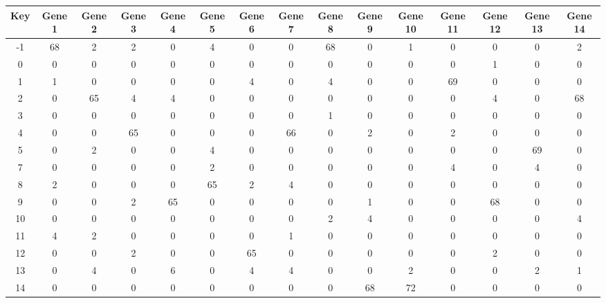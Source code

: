 \begin{tabular}{|c|c|c|c|c|c|c|c|c|c|c|c|c|c|c|}
\hline
Key & Gene 1 & Gene 2 & Gene 3 & Gene 4 & Gene 5 & Gene 6 & Gene 7 & Gene 8 & Gene 9 & Gene 10 & Gene 11 & Gene 12 & Gene 13 & Gene 14 \\
\hline
-1 & 68 & 2 & 2 & 0 & 4 & 0 & 0 & 68 & 0 & 1 & 0 & 0 & 0 & 2 \\
0 & 0 & 0 & 0 & 0 & 0 & 0 & 0 & 0 & 0 & 0 & 0 & 1 & 0 & 0 \\
1 & 1 & 0 & 0 & 0 & 0 & 4 & 0 & 4 & 0 & 0 & 69 & 0 & 0 & 0 \\
2 & 0 & 65 & 4 & 4 & 0 & 0 & 0 & 0 & 0 & 0 & 0 & 4 & 0 & 68 \\
3 & 0 & 0 & 0 & 0 & 0 & 0 & 0 & 1 & 0 & 0 & 0 & 0 & 0 & 0 \\
4 & 0 & 0 & 65 & 0 & 0 & 0 & 66 & 0 & 2 & 0 & 2 & 0 & 0 & 0 \\
5 & 0 & 2 & 0 & 0 & 4 & 0 & 0 & 0 & 0 & 0 & 0 & 0 & 69 & 0 \\
7 & 0 & 0 & 0 & 0 & 2 & 0 & 0 & 0 & 0 & 0 & 4 & 0 & 4 & 0 \\
8 & 2 & 0 & 0 & 0 & 65 & 2 & 4 & 0 & 0 & 0 & 0 & 0 & 0 & 0 \\
9 & 0 & 0 & 2 & 65 & 0 & 0 & 0 & 0 & 1 & 0 & 0 & 68 & 0 & 0 \\
10 & 0 & 0 & 0 & 0 & 0 & 0 & 0 & 2 & 4 & 0 & 0 & 0 & 0 & 4 \\
11 & 4 & 2 & 0 & 0 & 0 & 0 & 1 & 0 & 0 & 0 & 0 & 0 & 0 & 0 \\
12 & 0 & 0 & 2 & 0 & 0 & 65 & 0 & 0 & 0 & 0 & 0 & 2 & 0 & 0 \\
13 & 0 & 4 & 0 & 6 & 0 & 4 & 4 & 0 & 0 & 2 & 0 & 0 & 2 & 1 \\
14 & 0 & 0 & 0 & 0 & 0 & 0 & 0 & 0 & 68 & 72 & 0 & 0 & 0 & 0 \\
\hline
\end{tabular}